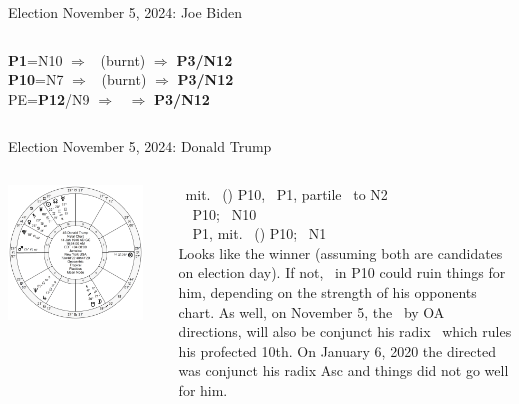 \begin{frame}[t]{Election November 5, 2024: Joe Biden}
\begin{columns}[T, onlytextwidth]
\textbf{\dgreen P1}=N10
	$\Rightarrow$ \Mercury\, (burnt) $\Rightarrow$ \textbf{\dgreen P3/N12}\\
\textbf{\red P10}=N7
	$\Rightarrow$ \Mercury\, (burnt) $\Rightarrow$ \textbf{\dgreen P3/N12}\\
PE=\textbf{\dgreen P12}/N9
	 $\Rightarrow$ \Sun\, $\Rightarrow$ \textbf{\dgreen P3/N12}

\end{columns}
\end{frame}

\begin{frame}[t]{Election November 5, 2024: Donald Trump}
\small
\begin{columns}[T, onlytextwidth]
\vspace{-1em}
{\includegraphics[width=0.9\textwidth]{charts/Trump.png}}
\fontsize{5pt}{6pt}\selectfont

\Saturn\, mit. \Quincunx\, (\Opposition) P10, \Trine\, P1, partile \Sextile\, to N2 \\
\Mars\, \Trine\, P10; \Square\, N10 \\
\Mercury\, \Trine\, P1, mit. \Quincunx\, (\Opposition) P10; \Sextile\, N1 \\
\vspace{0.5em}
Looks like the winner (assuming both are candidates on election day). If not,  \SouthNode\, in P10 could ruin things for him, depending on the strength of his opponents chart. As well, on November 5, the \SouthNode\, by OA directions, will also be conjunct his radix \Mars\, which rules his profected 10th. On January 6, 2020 the directed \SouthNode\, was conjunct his radix Asc and things did not go well for him.


\end{columns}
\end{frame}
